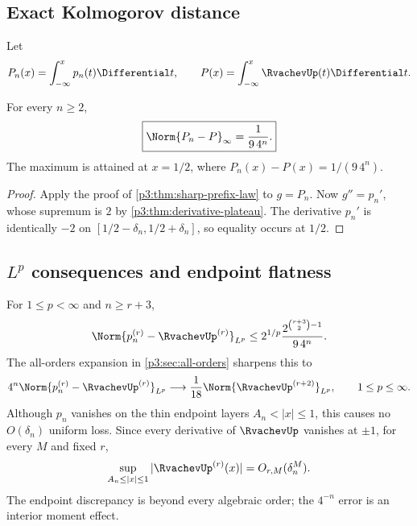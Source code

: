 \documentclass[11pt,oneside]{article}
\numberwithin{equation}{section}
\theoremstyle{definition}
\theoremstyle{remark}
\begin{document}
\subsection{Exact Kolmogorov distance}

Let
\begin{equation}
 P_n(x)=\int_{-\infty}^x p_n(t)\Differential t,
 \qquad
 P(x)=\int_{-\infty}^x\RvachevUp(t)\Differential t.
 \label{p3:eq:cdfs}
\end{equation}

\begin{corollary}
\label{p3:cor:kolmogorov}
For every $n\ge2$,
\begin{equation}
 \boxed{
 \Norm{P_n-P}_\infty=\frac{1}{9\,4^n}.}
 \label{p3:eq:kolmogorov}
\end{equation}
The maximum is attained at $x=1/2$, where $P_n(x)-P(x)=1/(9\,4^n)$.
\end{corollary}

\begin{proof}
Apply the proof of \cref{p3:thm:sharp-prefix-law} to $g=P_n$.  Now
$g''=p_n'$, whose supremum is $2$ by \cref{p3:thm:derivative-plateau}.  The derivative
$p_n'$ is identically $-2$ on
$[1/2-\delta_n,1/2+\delta_n]$, so equality occurs at $1/2$.
\end{proof}

\subsection{$L^p$ consequences and endpoint flatness}

For $1\le p<\infty$ and $n\ge r+3$,
\begin{equation}
 \Norm{p_n^{(r)}-\RvachevUp^{(r)}}_{L^p}
 \le 2^{1/p}\frac{2^{\binom{r+3}{2}-1}}{9\,4^n}.
 \label{p3:eq:lp-upper}
\end{equation}
The all-orders expansion in \cref{p3:sec:all-orders} sharpens this to
\begin{equation}
 4^n\Norm{p_n^{(r)}-\RvachevUp^{(r)}}_{L^p}
 \longrightarrow \frac1{18}\Norm{\RvachevUp^{(r+2)}}_{L^p},
 \qquad 1\le p\le\infty.
 \label{p3:eq:lp-asymptotic}
\end{equation}
Although $p_n$ vanishes on the thin endpoint layers
$A_n<|x|\le1$, this causes no $O(\delta_n)$ uniform loss.  Since every derivative of
$\RvachevUp$ vanishes at $\pm1$, for every $M$ and fixed $r$,
\begin{equation}
 \sup_{A_n\le|x|\le1}|\RvachevUp^{(r)}(x)|=O_{r,M}(\delta_n^M).
 \label{p3:eq:endpoint-superalgebraic}
\end{equation}
The endpoint discrepancy is beyond every algebraic order; the $4^{-n}$ error is an
interior moment effect.
\end{document}
